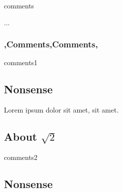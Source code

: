 
	\begin{saveblock}{comments}
		\begin{highlightblock}[linewidth=0.9\textwidth,gobble=12]
			\let\UL\ul
			\makeatletter
			\renewcommand\ul{
				\let\set@color\beamerorig@set@color
				\let\reset@color\beamerorig@reset@color
				\UL
			}
			...
		\end{highlightblock}
	\end{saveblock}

	\begin{frame}
		\frametitle{\lang,Comments,Comments,}

	\end{frame}

	\begin{saveblock}{comments1}
		\begin{highlightblock}[linewidth=0.6\textwidth,gobble=12]
			\section{Nonsense}

			Lorem ipsum dolor sit amet,
			 sit amet.

			\subsection{About $\sqrt{2}$}
		\end{highlightblock}
	\end{saveblock}

	\begin{saveblock}{comments2}
		\begin{highlightblock}[linewidth=0.6\textwidth,gobble=12]
			\section{Nonsense}

		\end{highlightblock}
	\end{saveblock}

